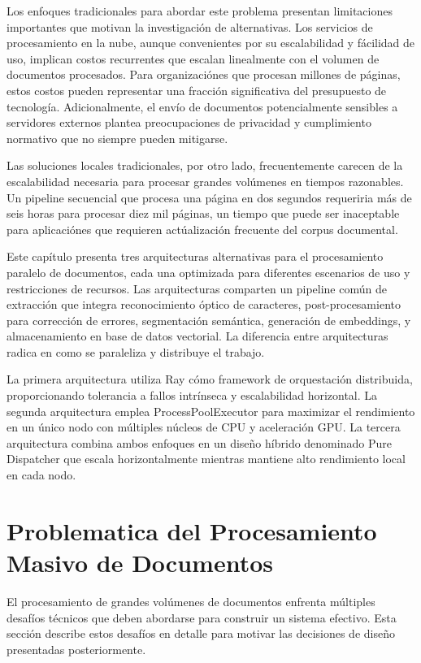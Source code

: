 \documentclass[12pt,a4paper,twoside]{book}
\begin{document}
Los enfoques tradicionales para abordar este problema presentan limitaciones importantes que motivan la investigación de alternativas. Los servicios de procesamiento en la nube, aunque convenientes por su escalabilidad y fácilidad de uso, implican costos recurrentes que escalan linealmente con el volumen de documentos procesados. Para organizaciónes que procesan millones de páginas, estos costos pueden representar una fracción significativa del presupuesto de tecnología. Adicionalmente, el envío de documentos potencialmente sensibles a servidores externos plantea preocupaciones de privacidad y cumplimiento normativo que no siempre pueden mitigarse.

Las soluciones locales tradicionales, por otro lado, frecuentemente carecen de la escalabilidad necesaria para procesar grandes volúmenes en tiempos razonables. Un pipeline secuencial que procesa una página en dos segundos requeriria más de seis horas para procesar diez mil páginas, un tiempo que puede ser inaceptable para aplicaciónes que requieren actúalización frecuente del corpus documental.

Este capítulo presenta tres arquitecturas alternativas para el procesamiento paralelo de documentos, cada una optimizada para diferentes escenarios de uso y restricciones de recursos. Las arquitecturas comparten un pipeline común de extracción que integra reconocimiento óptico de caracteres, post-procesamiento para corrección de errores, segmentación semántica, generación de embeddings, y almacenamiento en base de datos vectorial. La diferencia entre arquitecturas radica en como se paraleliza y distribuye el trabajo.

La primera arquitectura utiliza Ray cómo framework de orquestación distribuida, proporcionando tolerancia a fallos intrínseca y escalabilidad horizontal. La segunda arquitectura emplea ProcessPoolExecutor para maximizar el rendimiento en un único nodo con múltiples núcleos de CPU y aceleración GPU. La tercera arquitectura combina ambos enfoques en un diseño híbrido denominado Pure Dispatcher que escala horizontalmente mientras mantiene alto rendimiento local en cada nodo.

\section{Problematica del Procesamiento Masivo de Documentos}

El procesamiento de grandes volúmenes de documentos enfrenta múltiples desafíos técnicos que deben abordarse para construir un sistema efectivo. Esta sección describe estos desafíos en detalle para motivar las decisiones de diseño presentadas posteriormente.
\end{document}
